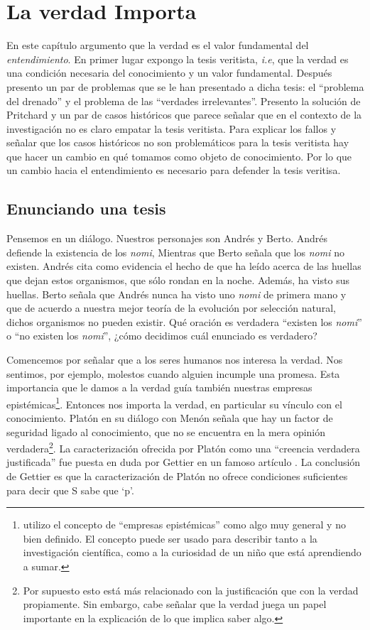 \documentclass{article}
\begin{document}
\listoftodos

\section{La verdad Importa}

\noindent En este capítulo argumento que la verdad es el valor fundamental del \textit{entendimiento}. En primer lugar expongo la tesis veritista, \textit{i.e}, que la verdad es una condición necesaria del conocimiento y un valor fundamental. Después presento un par de problemas que se le han presentado a dicha tesis: el ``problema del drenado'' y el problema de las ``verdades irrelevantes''. Presento la solución de Pritchard y un par de casos históricos que parece señalar que en el contexto de la investigación no es claro empatar la tesis veritista. Para explicar los fallos y señalar que los casos históricos no son problemáticos para la tesis veritista hay que hacer un cambio en qué tomamos como objeto de conocimiento. Por lo que un cambio hacia el entendimiento es necesario para defender la tesis veritisa.

\subsection{Enunciando una tesis} \label{enunc}

\noindent Pensemos en un diálogo. Nuestros personajes son Andrés y Berto. Andrés defiende la existencia de los \textit{nomi}, Mientras que Berto señala que los \textit{nomi} no existen. Andrés cita como evidencia el hecho de que ha leído acerca de las huellas que dejan estos organismos, que sólo rondan en la noche. Además, ha visto sus huellas. Berto señala que Andrés nunca ha visto uno \textit{nomi} de primera mano y que de acuerdo a nuestra mejor teoría de la evolución por selección natural, dichos organismos no pueden existir. Qué oración es verdadera ``existen los \textit{nomi}'' o ``no existen los \textit{nomi}'', ¿cómo decidimos cuál enunciado es verdadero?

Comencemos por señalar que a los seres humanos nos interesa la verdad. Nos sentimos, por ejemplo, molestos cuando alguien incumple una promesa. Esta importancia que le damos a la verdad guía también nuestras empresas epistémicas\footnote{utilizo el concepto de ``empresas epistémicas'' como algo muy general y no bien definido. El concepto puede ser usado para describir tanto a la investigación científica, como a la curiosidad de un niño que está aprendiendo a sumar.}. Entonces nos importa la verdad, en particular su vínculo con el conocimiento. Platón en su diálogo con Menón \cite[\P\P 97a-98b]{platonmeno} señala que hay un factor de seguridad ligado al conocimiento, que no se encuentra en la mera opinión verdadera\footnote{Por supuesto esto está más relacionado con la justificación que con la verdad propiamente. Sin embargo, cabe señalar que la verdad juega un papel importante en la explicación de lo que implica saber algo.}. La caracterización ofrecida por Platón como una ``creencia verdadera justificada'' fue puesta en duda por Gettier en un famoso artículo \citeyear{Gettier}. La conclusión de Gettier es que la caracterización de Platón no ofrece condiciones suficientes para decir que S sabe que `p'.
\end{document}
